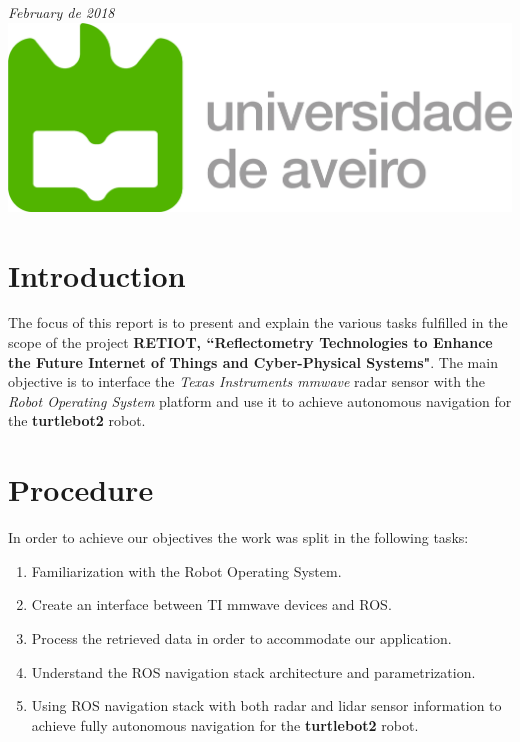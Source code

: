 \documentclass[12pt]{article}
\begin{document}
\begin{titlepage}
{\large \emph{February de 2018}}\\[2cm] %


\includegraphics[scale=0.4]{ua_logo.png} %
 

\vfill %

\end{titlepage}
\tableofcontents
\newpage

\section{Introduction}
The focus of this report is to present and explain the various tasks fulfilled in the scope of the project \textbf{RETIOT, “Reflectometry Technologies to Enhance the Future Internet of Things and Cyber-Physical Systems"}. The main objective is to interface the \textit{Texas Instruments mmwave} radar sensor with the \textit{Robot Operating System} platform and use it to achieve autonomous navigation for the \textbf{turtlebot2} robot.


\section{Procedure}
In order to achieve our objectives the work was split in the following tasks:
\begin{enumerate}
    \item Familiarization with the Robot Operating System.
    \item Create an interface between TI mmwave devices and ROS.
    \item Process the retrieved data in order to  accommodate our application.
    \item Understand the ROS navigation stack architecture and parametrization.
    \item Using ROS navigation stack with both radar and lidar sensor information to achieve fully autonomous navigation for the \textbf{turtlebot2} robot.
\end{enumerate}
\end{document}
